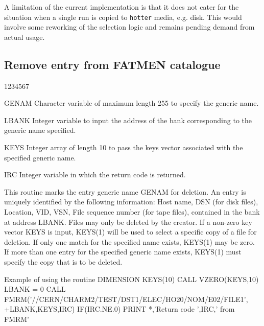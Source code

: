 A limitation of the current implementation is that it does not cater for
the situation when a single run is copied to {\tt hotter} media,
e.g. disk. This would involve some reworking of the selection logic
and remains pending demand from actual usage.

\subsection{Remove entry from FATMEN catalogue}
\begin{DLtt}{1234567}
\item[GENAM]
Character variable of maximum length 255 to specify the generic name.
\item[LBANK]
Integer variable to input the address of the bank corresponding
to the generic name specified.
\item[KEYS]
Integer array of length 10 to pass the keys vector associated
with the specified generic name.
\item[IRC]
Integer variable in which the return code is returned.
\end{DLtt}
\par
This routine marks the entry generic name GENAM
for deletion.
An entry is uniquely identified
by the following information: Host name, DSN (for disk files), Location,
VID, VSN, File sequence number (for tape files), contained in the bank
at address LBANK. Files may only be deleted by the creator.
If a non-zero key vector KEYS
is input, KEYS(1) will be used to select
a specific copy of a file for deletion. If only one match for the
specified name exists, KEYS(1) may be zero. If more than one
entry for the specified generic name exists, KEYS(1) must specify
the copy that is to be deleted.

\begin{XMPt}{Example of using the \protect{} routine}
      DIMENSION KEYS(10)
      CALL VZERO(KEYS,10)
      LBANK = 0
      CALL FMRM('//CERN/CHARM2/TEST/DST1/ELEC/HO20/NOM/E02/FILE1',
     +LBANK,KEYS,IRC)
      IF(IRC.NE.0) PRINT *,'Return code ',IRC,' from FMRM'
\end{XMPt}

